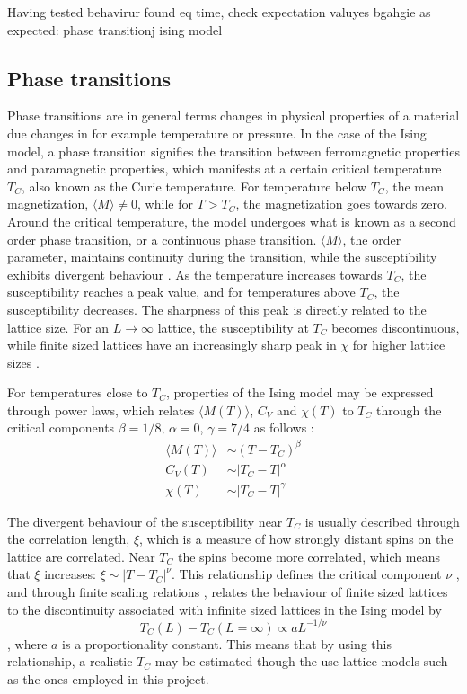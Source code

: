 \documentclass[%
oneside,                 %
final,                   %
10pt]{article}
\begin{document}
Having tested behavirur found eq time, check expectation valuyes bgahgie as expected: phase transitionj ising model

 
\subsection{Phase transitions}
\label{SS.M.Phase_trans}
Phase transitions are in general terms changes in physical properties of a material due changes in for example temperature or pressure. In the case of the Ising model, a phase transition signifies the transition between ferromagnetic properties and paramagnetic properties, which manifests at a certain critical temperature $T_C$, also known as the Curie temperature. For temperature below $T_C$, the mean magnetization, $\langle M \rangle \neq 0$, while for $T>T_C$, the magnetization goes towards zero. Around the critical temperature, the model undergoes what is known as a second order phase transition, or a continuous phase transition. $\langle M \rangle$, the order parameter, maintains continuity during the transition, while the susceptibility exhibits divergent behaviour \cite{Fitzpatrick}. As the temperature increases towards $T_C$, the susceptibility reaches a peak value, and for temperatures above $T_C$, the susceptibility decreases. The sharpness of this peak is directly related to the lattice size. For an $L \rightarrow \infty$ lattice, the susceptibility at $T_C$ becomes discontinuous, while finite sized lattices have an increasingly sharp peak in $\chi $ for higher lattice sizes \cite{HJ-SP}. \newline

For temperatures close to $T_C$, properties of the Ising model may be expressed through power laws, which relates $\langle M(T) \rangle$, $C_V$ and $\chi (T)$ to $T_C$ through the critical components $\beta =1/8$, $\alpha=0$, $\gamma=7/4$ as follows \cite{assignmentpaper}:
\begin{align*}
\langle M (T) \rangle &\sim (T-T_C)^{\beta} \\
C_V (T) &\sim |T_C-T|^{\alpha} \\
\chi(T) &\sim |T_C-T|^{\gamma}
\end{align*}

The divergent behaviour of the susceptibility near $T_C$ is usually described through the correlation length, $\xi$, which is a measure of how strongly distant  spins on the lattice are correlated.  Near $T_C$ the spins become more correlated, which means that $\xi$ increases: $ \xi \sim |T-T_C|^{\nu}$. This relationship defines the critical component $\nu$ \cite{HJ-SP}, and through  finite scaling relations \cite{assignmentpaper}, relates the behaviour of finite sized lattices to the discontinuity associated with infinite sized lattices in the Ising model by 
\begin{equation}
T_C(L)-T_C(L=\infty) \propto a L^{-1/\nu}
\label{eq:TCinf}
\end{equation}
, where $a$ is a proportionality constant. This means that by using this relationship, a realistic $T_C$ may be estimated though the use lattice models such as the ones employed in this project. \newline
\end{document}
